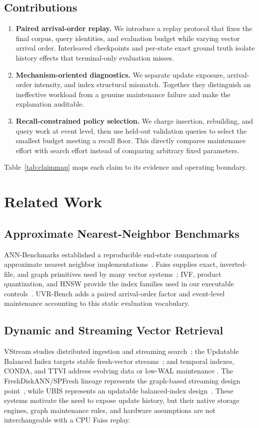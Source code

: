 \subsection{Contributions}
\begin{enumerate}
\item \textbf{Paired arrival-order replay.} We introduce a replay protocol that fixes
the final corpus, query identities, and evaluation budget while varying vector arrival
order. Interleaved checkpoints and per-state exact ground truth isolate history effects
that terminal-only evaluation misses.
\item \textbf{Mechanism-oriented diagnostics.} We separate update exposure, arrival-order
intensity, and index structural mismatch. Together they distinguish an ineffective
workload from a genuine maintenance failure and make the explanation auditable.
\item \textbf{Recall-constrained policy selection.} We charge insertion, rebuilding,
and query work at event level, then use held-out validation queries to select the
smallest budget meeting a recall floor. This directly compares maintenance effort with
search effort instead of comparing arbitrary fixed parameters.
\end{enumerate}
Table~\ref{tab:claimmap} maps each claim to its evidence and operating boundary.


\section{Related Work}
\subsection{Approximate Nearest-Neighbor Benchmarks}
ANN-Benchmarks established a reproducible end-state comparison of approximate nearest
neighbor implementations~\cite{annbench}. Faiss supplies exact, inverted-file, and
graph primitives used by many vector systems~\cite{faiss,faisslibrary}; IVF,
product quantization, and HNSW provide the index families used in our executable
controls~\cite{ivf,hnsw}. UVR-Bench adds a paired arrival-order factor and event-level
maintenance accounting to this static evaluation vocabulary.

\subsection{Dynamic and Streaming Vector Retrieval}
VStream studies distributed ingestion and streaming search~\cite{vstream}; the
Updatable Balanced Index targets stable fresh-vector streams~\cite{updatable}; and
temporal indexes, CONDA, and TTVI address evolving data or low-WAL maintenance
\cite{temporalann,conda,ttvi}. The FreshDiskANN/SPFresh lineage represents the
graph-based streaming design point~\cite{spfresh}, while UBIS represents an updatable
balanced-index design~\cite{updatable}. These systems motivate the need to expose update
history, but their native storage engines, graph maintenance rules, and hardware
assumptions are not interchangeable with a CPU Faiss replay.

